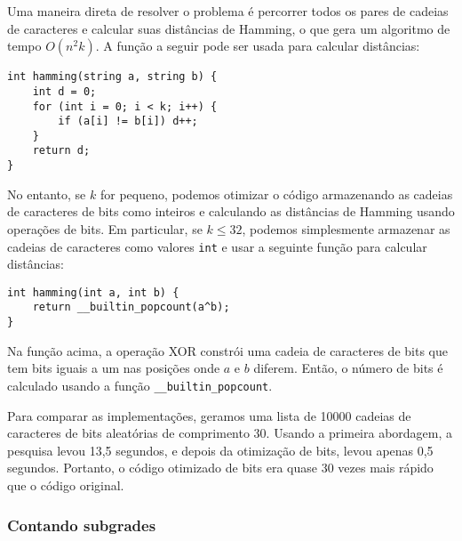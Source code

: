 Uma maneira direta de resolver o problema é
percorrer todos os pares de cadeias de caracteres e calcular
suas distâncias de Hamming,
o que gera um algoritmo de tempo $O(n^2 k)$.
A função a seguir pode ser usada para
calcular distâncias:
\begin{lstlisting}
int hamming(string a, string b) {
    int d = 0;
    for (int i = 0; i < k; i++) {
        if (a[i] != b[i]) d++;
    }
    return d;
}
\end{lstlisting}

No entanto, se $k$ for pequeno, podemos otimizar o código
armazenando as cadeias de caracteres de bits como inteiros e
calculando as distâncias de Hamming usando operações de bits.
Em particular, se $k \le 32$, podemos simplesmente armazenar
as cadeias de caracteres como valores \texttt{int} e usar a
seguinte função para calcular distâncias:
\begin{lstlisting}
int hamming(int a, int b) {
    return __builtin_popcount(a^b);
}
\end{lstlisting}
Na função acima, a operação XOR constrói
uma cadeia de caracteres de bits que tem bits iguais a um nas posições
onde $a$ e $b$ diferem.
Então, o número de bits é calculado usando
a função \texttt{\_\_builtin\_popcount}.

Para comparar as implementações, geramos
uma lista de 10000 cadeias de caracteres de bits aleatórias de comprimento 30.
Usando a primeira abordagem, a pesquisa levou
13,5 segundos, e depois da otimização de bits,
levou apenas 0,5 segundos.
Portanto, o código otimizado de bits era quase
30 vezes mais rápido que o código original.

\subsubsection{Contando subgrades}

